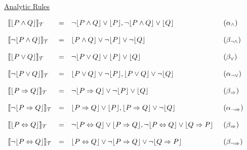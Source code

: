 \begin{figure}[htbp]
\parbox{\textwidth}
{\small
\underline{Analytic Rules}
\begin{center}
$\begin{array}{lll@{\hspace{0.5cm}}l}
\llbracket{}\lfloor{}P\land{}Q\rfloor{}\rrbracket_\mathcal{T} & = &
\neg\lfloor{}P\land{}Q\rfloor\lor\lfloor{}P\rfloor,
\neg\lfloor{}P\land{}Q\rfloor\lor\lfloor{}Q\rfloor & (\alpha_\land)\\\\

\llbracket\neg\lfloor{}P\land{}Q\rfloor{}\rrbracket_\mathcal{T} & = &
\lfloor{}P\land{}Q\rfloor\lor\neg\lfloor{}P\rfloor\lor\neg\lfloor{}Q\rfloor &
(\beta_{\neg\land})\\\\

\llbracket{}\lfloor{}P\lor{}Q\rfloor{}\rrbracket_\mathcal{T} & = &
\neg\lfloor{}P\lor{}Q\rfloor\lor\lfloor{}P\rfloor\lor\lfloor{}Q\rfloor &
(\beta_\lor)\\\\

\llbracket\neg\lfloor{}P\lor{}Q\rfloor{}\rrbracket_\mathcal{T} & = &
\lfloor{}P\lor{}Q\rfloor\lor\neg\lfloor{}P\rfloor,
\lfloor{}P\lor{}Q\rfloor\lor\neg\lfloor{}Q\rfloor &
(\alpha_{\neg\lor})\\\\

\llbracket{}\lfloor{}P\Rightarrow{}Q\rfloor{}\rrbracket_\mathcal{T} & = &
\neg\lfloor{}P\Rightarrow{}Q\rfloor\lor\neg\lfloor{}P\rfloor\lor
\lfloor{}Q\rfloor & (\beta_\Rightarrow)\\\\

\llbracket\neg\lfloor{}P\Rightarrow{}Q\rfloor{}\rrbracket_\mathcal{T} & = &
\lfloor{}P\Rightarrow{}Q\rfloor\lor\lfloor{}P\rfloor,
\lfloor{}P\Rightarrow{}Q\rfloor\lor\neg\lfloor{}Q\rfloor &
(\alpha_{\neg\Rightarrow})\\\\

\llbracket{}\lfloor{}P\Leftrightarrow{}Q\rfloor{}\rrbracket_\mathcal{T} & = &
\neg\lfloor{}P\Leftrightarrow{}Q\rfloor\lor\lfloor{}P\Rightarrow{}Q\rfloor,
\neg\lfloor{}P\Leftrightarrow{}Q\rfloor\lor\lfloor{}Q\Rightarrow{}P\rfloor &
(\beta_\Rightarrow)\\\\

\llbracket{}\neg\lfloor{}P\Leftrightarrow{}Q\rfloor{}\rrbracket_\mathcal{T} &
= &
\lfloor{}P\Leftrightarrow{}Q\rfloor\lor\neg\lfloor{}P\Rightarrow{}Q\rfloor\lor
\neg\lfloor{}Q\Rightarrow{}P\rfloor & (\beta_{\neg\Rightarrow})
\end{array}$
\end{center}

}
\end{figure}
